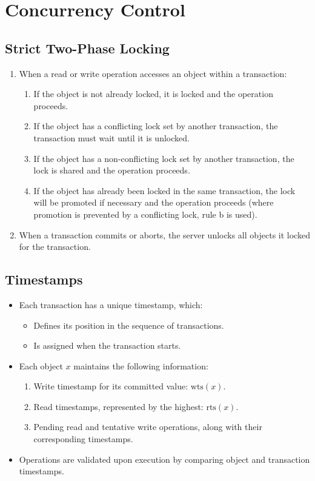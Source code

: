 \section{Concurrency Control}
\subsection{Strict Two-Phase Locking}
\begin{enumerate}
\item When a read or write operation accesses an object within a transaction:
\begin{enumerate}
\item If the object is not already locked, it is locked and the operation proceeds.
\item If the object has a conflicting lock set by another transaction, the transaction must wait until it is unlocked.
\item If the object has a non-conflicting lock set by another transaction, the lock is shared and the operation proceeds.
\item If the object has already been locked in the same transaction, the lock will be promoted if necessary and the operation proceeds (where promotion is prevented by a conflicting lock, rule b is used).
\end{enumerate}

\item When a transaction commits or aborts, the server unlocks all objects it locked for the transaction.
\end{enumerate}

\subsection{Timestamps}
\begin{itemize}
\item Each transaction has a unique timestamp, which:
\begin{itemize}
\item Defines its position in the sequence of transactions.
\item Is assigned when the transaction starts.
\end{itemize}

\item Each object \( x \) maintains the following information:
\begin{enumerate}
\item Write timestamp for its committed value: \( \text{wts}(x) \).
\item Read timestamps, represented by the highest: \( \text{rts}(x) \).
\item Pending read and tentative write operations, along with their corresponding timestamps.
\end{enumerate}

\item Operations are validated upon execution by comparing object and transaction timestamps.
\end{itemize}

